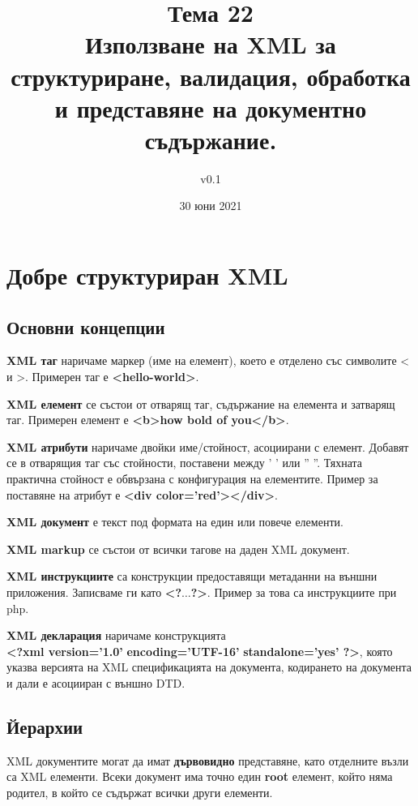 \documentclass[fleqn,12pt]{article}
\title{Тема 22 \\Използване на XML за структуриране, валидация, обработка и представяне на документно съдържание.}
\author{v0.1}
\date{30 юни 2021}
\begin{document}
\maketitle
\tableofcontents
\pagebreak

\section{Добре структуриран XML}

\subsection{Основни концепции}

\textbf{XML таг} наричаме маркер (име на елемент), което е отделено със символите < и >. Примерен таг е \textbf{<hello-world>}.
\bigbreak

\textbf{XML елемент} се състои от отварящ таг, съдържание на елемента и затварящ таг. Примерен елемент е \textbf{<b>how bold of you</b>}.
\bigbreak

\textbf{XML атрибути} наричаме двойки име/стойност, асоциирани с елемент.
Добавят се в отварящия таг със стойности, поставени между ' ' или '' ''.
Тяхната практична стойност е обвързана с конфигурация на елементите.
Пример за поставяне на атрибут е \textbf{<div color='red'></div>}.
\bigbreak

\textbf{XML документ} е текст под формата на един или повече елементи.
\bigbreak

\textbf{XML markup} се състои от всички тагове на даден XML документ.
\bigbreak

\textbf{XML инструкциите} са конструкции предоставящи метаданни на външни приложения. Записваме ги като \textbf{<?$\dots$?>}. Пример за това са инструкциите при php.
\bigbreak

\textbf{XML декларация} наричаме конструкцията \\\textbf{<?xml version='1.0'} \textbf{encoding='UTF-16'} \textbf{standalone='yes' ?>}, която указва версията на XML спецификацията на документа, кодирането на документа и дали е асоцииран с външно DTD.


\subsection{Йерархии}

XML документите могат да имат \textbf{дървовидно} представяне, като отделните възли са XML елементи.
Всеки документ има точно един \textbf{root} елемент, който няма родител, в който се съдържат всички други елементи.
\end{document}
